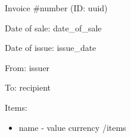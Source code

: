 \documentclass{article}
\begin{document}
  Invoice \#{{number}} (ID: {{uuid}})

  Date of sale: {{date_of_sale}}

  Date of issue: {{issue_date}}

  From:
  {{issuer}}

  To:
  {{recipient}}

  Items:
  \begin{itemize}
    {{#items}}
    \item{ {{name}} - {{value}} {{currency}} }
    {{/items}}
  \end{itemize}
\end{document}
